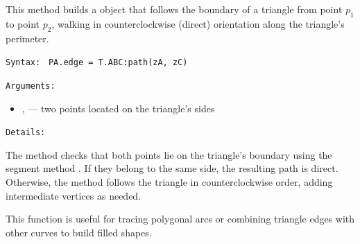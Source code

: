 This method builds a  object that follows the boundary of a triangle from point $p_1$ to point $p_2$, walking in counterclockwise (direct) orientation along the triangle's perimeter.

\texttt{Syntax: } \verb|PA.edge = T.ABC:path(zA, zC)|

\texttt{Arguments: }

\begin{itemize}
\item {},  — two points located on the triangle’s sides
\end{itemize}

\texttt{Details: }


The method checks that both points lie on the triangle’s boundary using the segment method . If they belong to the same side, the resulting path is direct. Otherwise, the method follows the triangle in counterclockwise order, adding intermediate vertices as needed.

This function is useful for tracing polygonal arcs or combining triangle edges with other curves to build filled shapes.


\begin{center}
\end{center}
\endinput